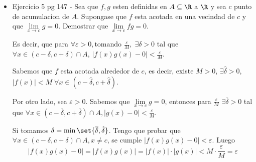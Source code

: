 \begin{example}
	\begin{itemize}
		\item Ejercicio 5 pg 147 - Sea que \(f,g \) esten definidas en \(A \subseteq \R \) a \(\R \) y sea \(c \) punto de acumulacion de \(A \). Supongase que \(f \) esta acotada en una vecindad de \(c \) y que \(\lim\limits_{x  \to c } g = 0 \). Demostrar que \(\lim\limits_{x  \to  c } fg = 0 \).
		      
		      Es decir, que para \(\forall \varepsilon > 0, \text{tomando } \frac{\varepsilon}{M},  \;\exists \delta > 0\) tal que \(\forall x \in (c - \delta, c + \delta) \cap A \), \(\left\vert f(x)g(x) - 0  \right\vert < \frac{\varepsilon}{M}\).
		      
		      Sabemos que \(f \) esta acotada alrededor de \(c \), es decir, existe \(M > 0 \), \(\exists \hat{\delta} > 0 \), \(\left\vert f(x ) \right\vert < M \; \forall x \in (c - \hat{\delta}, c + \hat{\delta })\).
		      
		      Por otro lado, sea \(\varepsilon > 0 \). Sabemos que \(\lim\limits_{x  \to c } g = 0 \), entonces para \(\frac{\varepsilon}{M}\) \(\exists \overline{\delta} > 0 \) tal que \(\forall x \in (c - \overline{\delta}, c + \overline{\delta}) \cap A, \left\vert g(x) - 0  \right\vert < \frac{\varepsilon}{M}\).
		      
		      Si tomamos \(\delta = \min\set{\overline{\delta}, \hat{\delta }}\). Tengo que probar que \(\forall x \in (c - \delta, c + \delta) \cap A, x \neq c \), se cumple \(\left\vert f(x) g(x) - 0  \right\vert < \varepsilon\). Luego
		      \[
			      \left\vert f(x)g(x) - 0  \right\vert = \left\vert f(x) g(x ) \right\vert  = \left\vert f(x ) \right\vert \cdot \left\vert g(x ) \right\vert < M \cdot \frac{\varepsilon}{M} = \varepsilon
		      \]
		      
		      
		      
	\end{itemize}
\end{example}
